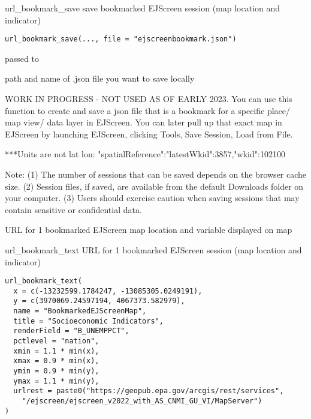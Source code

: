 \documentclass[a4paper]{book}
\begin{document}
%
\begin{Description}\relax
url\_bookmark\_save
save bookmarked EJScreen session (map location and indicator)
\end{Description}
%
\begin{Usage}
\begin{verbatim}
url_bookmark_save(..., file = "ejscreenbookmark.json")
\end{verbatim}
\end{Usage}
%
\begin{Arguments}
\begin{ldescription}
\item[\code{...}] passed to 

\item[\code{file}] path and name of .json file you want to save locally
\end{ldescription}
\end{Arguments}
%
\begin{Details}\relax
WORK IN PROGRESS - NOT USED AS OF EARLY 2023.
You can use this function to create and save a json file that is a bookmark
for a specific place/ map view/ data layer in EJScreen.
You can later pull up that exact map in EJScreen by launching EJScreen,
clicking Tools, Save Session, Load from File.

***Units are not lat lon: "spatialReference":"latestWkid":3857,"wkid":102100

Note:
(1) The number of sessions that can be saved depends on the browser cache size.
(2) Session files, if saved, are available from the default Downloads folder on your computer.
(3) Users should exercise caution when saving sessions that may contain sensitive or confidential data.
\end{Details}
%
\begin{Value}
URL for 1 bookmarked EJScreen map location and variable displayed on map
\end{Value}
%
\begin{Description}\relax
url\_bookmark\_text
URL for 1 bookmarked EJScreen session (map location and indicator)
\end{Description}
%
\begin{Usage}
\begin{verbatim}
url_bookmark_text(
  x = c(-13232599.1784247, -13085305.0249191),
  y = c(3970069.24597194, 4067373.582979),
  name = "BookmarkedEJScreenMap",
  title = "Socioeconomic Indicators",
  renderField = "B_UNEMPPCT",
  pctlevel = "nation",
  xmin = 1.1 * min(x),
  xmax = 0.9 * min(x),
  ymin = 0.9 * min(y),
  ymax = 1.1 * min(y),
  urlrest = paste0("https://geopub.epa.gov/arcgis/rest/services",
    "/ejscreen/ejscreen_v2022_with_AS_CNMI_GU_VI/MapServer")
)
\end{verbatim}
\end{Usage}
\end{document}
